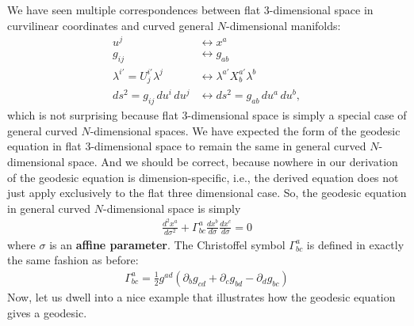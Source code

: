 \documentclass{book}
\theoremstyle{definition}
\begin{document}
We have seen multiple correspondences between flat 3-dimensional space in curvilinear coordinates and curved general $N$-dimensional manifolds:
\begin{align*}
u^j &\leftrightarrow x^a\\
g_{ij} &\leftrightarrow g_{ab}\\
\lambda^{i'} = U^{i'}_j\lambda^j &\leftrightarrow \lambda^{a'}X^{a'}_b\lambda^b\\
ds^2 = g_{ij}\,du^i\,du^j &\leftrightarrow ds^2 = g_{ab}\,du^a\,du^b,
\end{align*} 
which is not surprising because flat 3-dimensional space is simply a special case of general curved $N$-dimensional spaces. We have expected the form of the geodesic equation in flat 3-dimensional space to remain the same in general curved $N$-dimensional space. And we should be correct, because nowhere in our derivation of the geodesic equation is dimension-specific, i.e., the derived equation does not just apply exclusively to the flat three dimensional case. So, the geodesic equation in general curved $N$-dimensional space is simply
\begin{align*}
\boxed{\frac{d^2x^a}{d\sigma^2} + \Gamma^{a}_{bc}\frac{dx^b}{d\sigma}\frac{dx^c}{d\sigma} = 0}
\end{align*} 
where $\sigma$ is an \textbf{affine parameter}. The Christoffel symbol $\Gamma^{a}_{bc}$ is defined in exactly the same fashion as before:
\begin{align*}
\boxed{\Gamma^{a}_{bc} = \frac{1}{2}g^{ad}\left( \partial_b g_{cd} + \partial_c g_{bd} - \partial_d g_{bc}\right)}
\end{align*}
Now, let us dwell into a nice example that illustrates how the geodesic equation gives a geodesic. 
\end{document}
